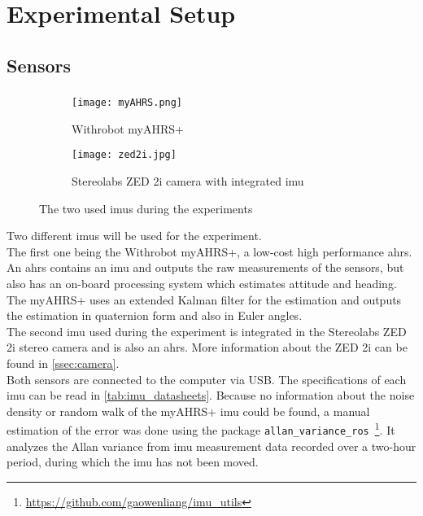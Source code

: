 \chapter{Experimental Setup}
\label{ch:ExperimentalSetup}

\section{Sensors}
\subsection{}
\begin{figure}[htb]
	\centering
	\begin{subfigure}[b]{0.4\textwidth}
		\centering
		\texttt{[image: myAHRS.png]}
		\caption{Withrobot myAHRS+ \cite{Withrobot2017}}
		\label{fig:imu_myahrs}
	\end{subfigure}
	\begin{subfigure}[b]{0.4\textwidth}
		\centering
		\texttt{[image: zed2i.jpg]}
		\caption{Stereolabs ZED 2i camera with integrated \acrshort{imu} \cite{Stereolabs2019}}
		\label{fig:imu_zed}
	\end{subfigure}
	\caption{The two used \acrshort{imu}s during the experiments}
	\label{fig:imus_used}
\end{figure}
Two different \glspl{imu} will be used for the experiment.\\
The first one being the Withrobot myAHRS+, a low-cost high performance \gls{ahrs}.
An \gls{ahrs} contains an \gls{imu} and outputs the raw measurements of the sensors, but also has an on-board processing system which estimates attitude and heading.
The myAHRS+ uses an extended Kalman filter for the estimation and outputs the estimation in quaternion form and also in Euler angles.\\
The second \gls{imu} used during the experiment is integrated in the Stereolabs ZED 2i stereo camera and is also an \gls{ahrs}.
More information about the ZED 2i can be found in \cref{ssec:camera}.\\
Both sensors are connected to the computer via USB.
The specifications of each \gls{imu} can be read in \cref{tab:imu_datasheets}.
Because no information about the noise density or random walk of the myAHRS+ \gls{imu} could be found, a manual estimation of the error was done using the package \texttt{allan\_variance\_ros}~\footnote{\url{https://github.com/gaowenliang/imu_utils}}.
It analyzes the Allan variance from \gls{imu} measurement data recorded over a two-hour period, during which the \gls{imu} has not been moved.
